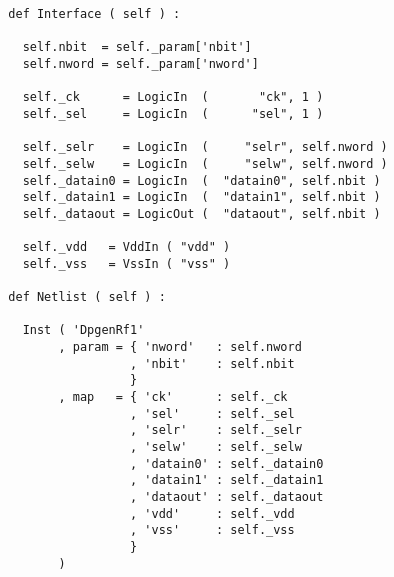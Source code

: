 \begin{itemize}
\begin{verbatim}
  def Interface ( self ) :
      
    self.nbit  = self._param['nbit']
    self.nword = self._param['nword']
      
    self._ck      = LogicIn  (       "ck", 1 )
    self._sel     = LogicIn  (      "sel", 1 )

    self._selr    = LogicIn  (     "selr", self.nword )
    self._selw    = LogicIn  (     "selw", self.nword )
    self._datain0 = LogicIn  (  "datain0", self.nbit )
    self._datain1 = LogicIn  (  "datain1", self.nbit )
    self._dataout = LogicOut (  "dataout", self.nbit ) 
    
    self._vdd   = VddIn ( "vdd" )
    self._vss   = VssIn ( "vss" )
    
  def Netlist ( self ) :
      
    Inst ( 'DpgenRf1'
         , param = { 'nword'   : self.nword
                   , 'nbit'    : self.nbit
                   }
         , map   = { 'ck'      : self._ck
                   , 'sel'     : self._sel
                   , 'selr'    : self._selr
                   , 'selw'    : self._selw
                   , 'datain0' : self._datain0
                   , 'datain1' : self._datain1
                   , 'dataout' : self._dataout
                   , 'vdd'     : self._vdd
                   , 'vss'     : self._vss
                   }
         )       
\end{verbatim}
\end{itemize}
